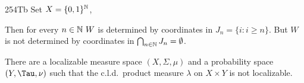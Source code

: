 \spheader 254Tb Set $X=\{0,1\}^{\Bbb N}$,


\noindent Then for every $n\in\Bbb N\,\,W$ is determined by coordinates
in
$J_n=\{i:i\ge n\}$.   But $W$ is not determined by coordinates in
$\bigcap_{n\in\Bbb N}J_n=\emptyset$.   


 There are a localizable measure space
$(X,\Sigma,\mu)$ and a
probability space $(Y,\Tau,\nu)$ such that the c.l.d.\ product measure
$\lambda$ on $X\times Y$ is not localizable.

